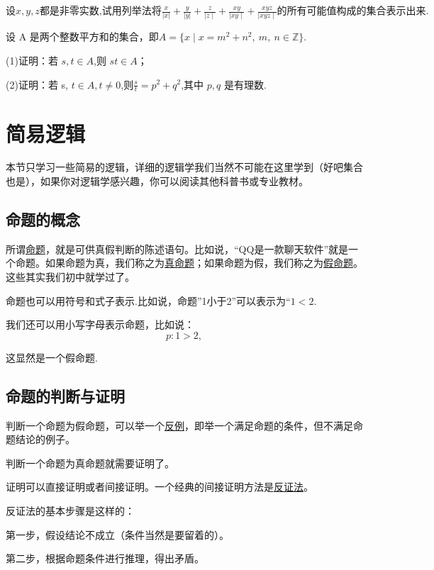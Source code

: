 \documentclass[lang=cn,math=cm,chinesefont=nofont,11pt,scheme=chinese,onecol]{elegantbook}
\begin{document}
\begin{exercise}\label{exer:17}
  $\text{设}x,y,z\text{都是非零实数,试用列举法将}\frac x{|x|}+\frac y{|y|}+{\frac{z}{\mid z\mid}}+{\frac{xy}{\mid xy\mid}}+{\frac{xyz}{\mid xyz\mid}}\text{的所有可能值构成的集合表示出来}.$
\end{exercise}

\begin{exercise}\label{exer:18}
  设 A 是两个整数平方和的集合，即$A=\{x\mid x=m^2+n^2,\:m,\:n\in\mathbb{Z}\}.$

(1)证明：若 $s,t{\in}A$,则 $st{\in}A$；

(2)证明：若 s, $t\in A,t\neq0$,则$\frac st=p^2+q^2$,其中 $p,q$ 是有理数.
\end{exercise}

\section{简易逻辑}
本节只学习一些简易的逻辑，详细的逻辑学我们当然不可能在这里学到（好吧集合也是），如果你对逻辑学感兴趣，你可以阅读其他科普书或专业教材。

\subsection{命题的概念}
所谓\underline{命题}，就是可供真假判断的陈述语句。比如说，“QQ是一款聊天软件”就是一个命题。如果命题为真，我们称之为\underline{真命题}；如果命题为假，我们称之为\underline{假命题}。这些其实我们初中就学过了。

命题也可以用符号和式子表示.比如说，命题”1小于2”可以表示为“$1<2$.

我们还可以用小写字母表示命题，比如说：$$p:1>2,$$

这显然是一个假命题.


\subsection{命题的判断与证明}

判断一个命题为假命题，可以举一个\underline{反例}，即举一个满足命题的条件，但不满足命题结论的例子。

判断一个命题为真命题就需要证明了。

证明可以直接证明或者间接证明。一个经典的间接证明方法是\underline{反证法}。

反证法的基本步骤是这样的：

第一步，假设结论不成立（条件当然是要留着的）。

第二步，根据命题条件进行推理，得出矛盾。
\end{document}
